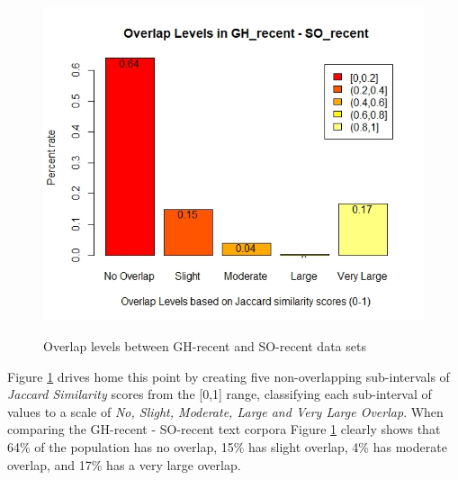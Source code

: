         \begin{figure}
          \centering
          \includegraphics[width=\textwidth]{figures/overlap_GH_SO_recent.jpeg}\\
          \caption{Overlap levels between GH-recent and SO-recent data sets}
          \label{fig:overlap_GH_SO_recent}
        \end{figure}
        
         Figure \ref{fig:overlap_GH_SO_recent} drives home this point by creating five non-overlapping sub-intervals of \emph{Jaccard Similarity} scores from the [0,1] range, classifying each sub-interval of values to a scale of \emph{No, Slight, Moderate, Large and Very Large Overlap}. When comparing the GH-recent - SO-recent text corpora Figure \ref{fig:overlap_GH_SO_recent} clearly shows that 64\% of the population has no overlap, 15\% has slight overlap, 4\% has moderate overlap, and 17\% has a very large overlap. 
        
